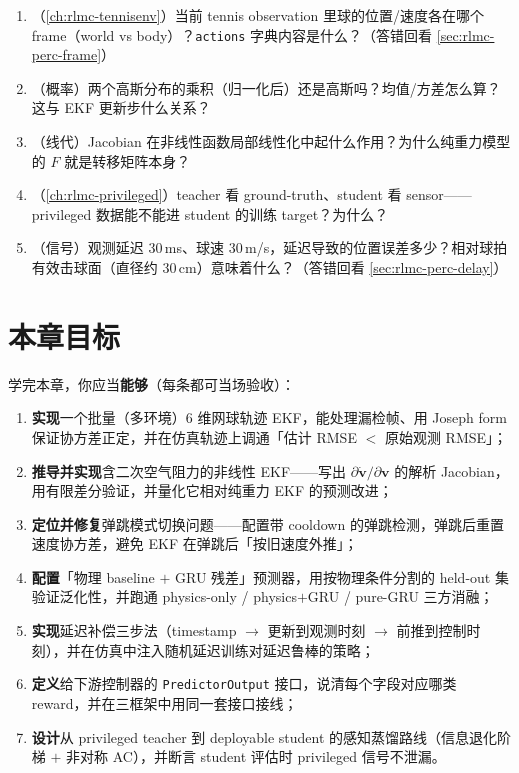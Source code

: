 \begin{practice}
\begin{enumerate}
  \item （\cref{ch:rlmc-tennisenv}）当前 tennis observation 里球的位置/速度各在哪个 frame（world vs body）？\texttt{actions} 字典内容是什么？（答错回看 \cref{sec:rlmc-perc-frame}）
  \item （概率）两个高斯分布的乘积（归一化后）还是高斯吗？均值/方差怎么算？这与 EKF 更新步什么关系？
  \item （线代）Jacobian 在非线性函数局部线性化中起什么作用？为什么纯重力模型的 $F$ 就是转移矩阵本身？
  \item （\cref{ch:rlmc-privileged}）teacher 看 ground-truth、student 看 sensor——privileged 数据能不能进 student 的训练 target？为什么？
  \item （信号）观测延迟 $30$\,ms、球速 $30$\,m/s，延迟导致的位置误差多少？相对球拍有效击球面（直径约 $30$\,cm）意味着什么？（答错回看 \cref{sec:rlmc-perc-delay}）
\end{enumerate}
\end{practice}

\section*{本章目标}
\label{sec:rlmc-perc-goals}

学完本章，你应当\textbf{能够}（每条都可当场验收）：

\begin{enumerate}
  \item \textbf{实现}一个批量（多环境）$6$ 维网球轨迹 EKF，能处理漏检帧、用 Joseph form 保证协方差正定，并在仿真轨迹上调通「估计 RMSE $<$ 原始观测 RMSE」；
  \item \textbf{推导并实现}含二次空气阻力的非线性 EKF——写出 $\partial\dot{\mathbf v}/\partial\mathbf v$ 的解析 Jacobian，用有限差分验证，并量化它相对纯重力 EKF 的预测改进；
  \item \textbf{定位并修复}弹跳模式切换问题——配置带 cooldown 的弹跳检测，弹跳后重置速度协方差，避免 EKF 在弹跳后「按旧速度外推」；
  \item \textbf{配置}「物理 baseline $+$ GRU 残差」预测器，用按物理条件分割的 held-out 集验证泛化性，并跑通 physics-only / physics$+$GRU / pure-GRU 三方消融；
  \item \textbf{实现}延迟补偿三步法（timestamp $\to$ 更新到观测时刻 $\to$ 前推到控制时刻），并在仿真中注入随机延迟训练对延迟鲁棒的策略；
  \item \textbf{定义}给下游控制器的 \verb|PredictorOutput| 接口，说清每个字段对应哪类 reward，并在三框架中用同一套接口接线；
  \item \textbf{设计}从 privileged teacher 到 deployable student 的感知蒸馏路线（信息退化阶梯 $+$ 非对称 AC），并断言 student 评估时 privileged 信号不泄漏。
\end{enumerate}

